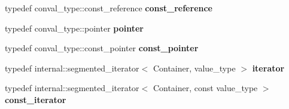 \begin{DoxyCompactItemize}
\item 
\hypertarget{classtbb_1_1interface6_1_1flattened2d_a9715dae5bf107ca3530a8c5bea12739c}{}typedef conval\+\_\+type\+::const\+\_\+reference {\bfseries const\+\_\+reference}\label{classtbb_1_1interface6_1_1flattened2d_a9715dae5bf107ca3530a8c5bea12739c}

\item 
\hypertarget{classtbb_1_1interface6_1_1flattened2d_a14285cc70108c2f0bc417bb034484a0b}{}typedef conval\+\_\+type\+::pointer {\bfseries pointer}\label{classtbb_1_1interface6_1_1flattened2d_a14285cc70108c2f0bc417bb034484a0b}

\item 
\hypertarget{classtbb_1_1interface6_1_1flattened2d_a4f67e5e005e394746b4c6d54a5c2748c}{}typedef conval\+\_\+type\+::const\+\_\+pointer {\bfseries const\+\_\+pointer}\label{classtbb_1_1interface6_1_1flattened2d_a4f67e5e005e394746b4c6d54a5c2748c}

\item 
\hypertarget{classtbb_1_1interface6_1_1flattened2d_a14b3602cf1c408c89015d7bf6bf59072}{}typedef internal\+::segmented\+\_\+iterator$<$ Container, value\+\_\+type $>$ {\bfseries iterator}\label{classtbb_1_1interface6_1_1flattened2d_a14b3602cf1c408c89015d7bf6bf59072}

\item 
\hypertarget{classtbb_1_1interface6_1_1flattened2d_a295c0b8755120359595a1b1f7447bbc8}{}typedef internal\+::segmented\+\_\+iterator$<$ Container, const value\+\_\+type $>$ {\bfseries const\+\_\+iterator}\label{classtbb_1_1interface6_1_1flattened2d_a295c0b8755120359595a1b1f7447bbc8}

\end{DoxyCompactItemize}
